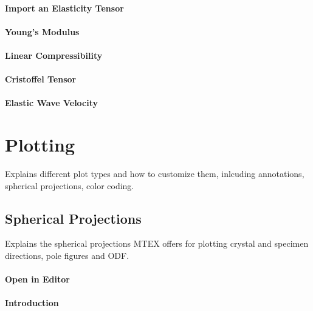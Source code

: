 \documentclass{article}
\begin{document}
			\paragraph{Import an Elasticity Tensor}
		
			\paragraph{Young's Modulus}
		
			\paragraph{Linear Compressibility}
		
			\paragraph{Cristoffel Tensor}
		
			\paragraph{Elastic Wave Velocity}
		
		\section{Plotting}

		
                  \begin{par}
Explains different plot types and how to customize them, inlcuding annotations, spherical projections, color coding.
\end{par} \vspace{1em}

               
		\subsection{Spherical Projections}

		
                     \begin{par}
Explains the spherical projections MTEX offers for plotting crystal and specimen directions, pole figures and ODF.
\end{par} \vspace{1em}

                  
			\paragraph{Open in Editor}
		
			\paragraph{Introduction}
		
\end{document}
